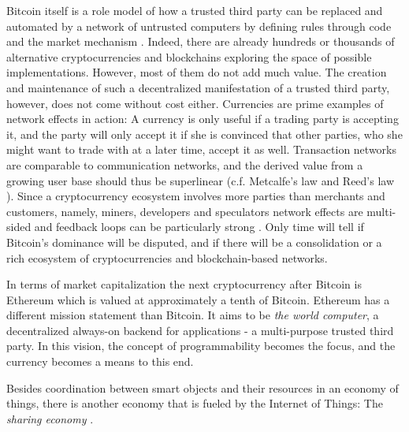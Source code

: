 Bitcoin itself is a role model of how a trusted third party can be replaced and automated by a network of untrusted computers by defining rules through code and the market mechanism \parencite{lessig2009code}. Indeed, there are already hundreds or thousands of alternative cryptocurrencies and blockchains exploring the space of possible implementations. However, most of them do not add much value. The creation and maintenance of such a decentralized manifestation of a trusted third party, however, does not come without cost either. Currencies are prime examples of network effects in action: A currency is only useful if a trading party is accepting it, and the party will only accept it if she is convinced that other parties, who she might want to trade with at a later time, accept it as well. Transaction networks are comparable to communication networks, and the derived value from a growing user base should thus be superlinear (c.f. Metcalfe's law \parencite{10.1109/MC.2013.374} and Reed's law \parencite{reed1999sneaky}). Since a cryptocurrency ecosystem involves more parties than merchants and customers, namely, miners, developers and speculators network effects are multi-sided and feedback loops can be particularly strong \parencite{Giaglis2014}. Only time will tell if Bitcoin's dominance will be disputed, and if there will be a consolidation or a rich ecosystem of cryptocurrencies and blockchain-based networks.

In terms of  market capitalization the next cryptocurrency after Bitcoin is Ethereum \parencite{ethereumWhite} which is valued at approximately a tenth of Bitcoin. Ethereum has a different mission statement than Bitcoin. It aims to be \emph{the world computer}, a decentralized always-on backend for applications - a multi-purpose trusted third party. In this vision, the concept of programmability becomes the focus, and the currency becomes a means to this end. 

Besides coordination between smart objects and their resources in an economy of things, there is another economy that is fueled by the Internet of Things: The \emph{sharing economy} \parencite{sundararajan2016sharing}.

